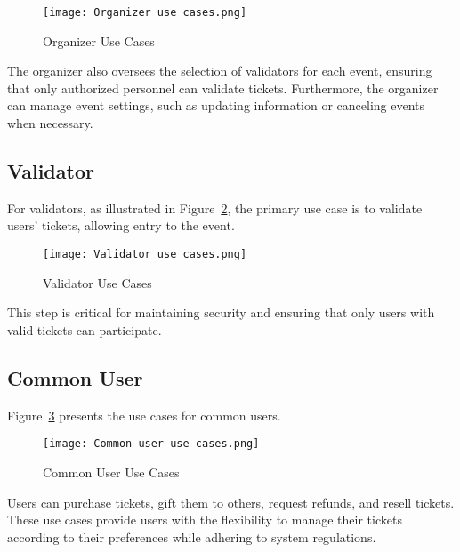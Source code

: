 \begin{figure}[H]
    \centering
    \texttt{[image: Organizer use cases.png]}
    \caption{Organizer Use Cases}
    \label{fig:organizer_use_cases}
\end{figure}

The organizer also oversees the selection of validators for each event,
ensuring that only authorized personnel can validate tickets. Furthermore, the
organizer can manage event settings, such as updating information or canceling
events when necessary.

\subsection{Validator}
\label{subsec:validator}

For validators, as illustrated in Figure~\ref{fig:validator_use_cases}, the
primary use case is to validate users' tickets, allowing entry to the event.

\begin{figure}[H]
    \centering
    \texttt{[image: Validator use cases.png]}
    \caption{Validator Use Cases}
    \label{fig:validator_use_cases}
\end{figure}

This step is critical for maintaining security and ensuring that only users
with valid tickets can participate.

\subsection{Common User}
\label{subsec:common_user}

Figure~\ref{fig:common_user_use_cases} presents the use cases for common users.

\begin{figure}[H]
    \centering
    \texttt{[image: Common user use cases.png]}
    \caption{Common User Use Cases}
    \label{fig:common_user_use_cases}
\end{figure}

Users can purchase tickets, gift them to others, request refunds, and resell tickets. These use cases provide users with the
flexibility to manage their tickets according to their preferences while
adhering to system regulations.
